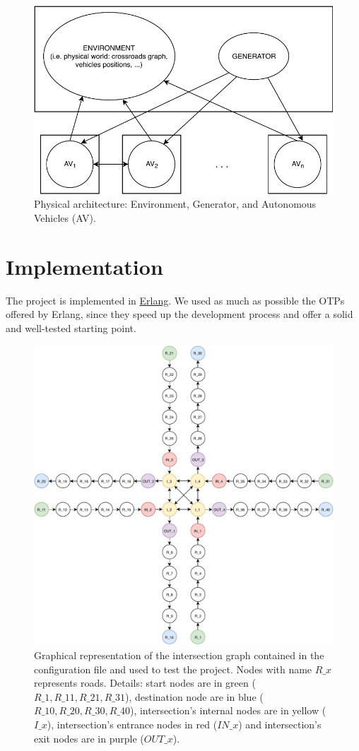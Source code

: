 \documentclass{memoir}
\begin{document}
\begin{figure}
	\centering
	\includegraphics[width=0.8\linewidth]{physical_architecture.pdf}
	\caption{Physical architecture: Environment, Generator, and Autonomous Vehicles (AV).}
	\label{fig:physical-architecture}
\end{figure}


\chapter{Implementation}
The project is implemented in \href{https://www.erlang.org/}{Erlang}. We used as much as possible the OTPs offered by Erlang, since they speed up the development process and offer a solid and well-tested starting point.

\begin{figure}
	\centering
	\includegraphics[width=\linewidth]{config_graph.pdf}
	\caption{Graphical representation of the intersection graph contained in the configuration file and used to test the project. Nodes with name $R\_x$ represents roads. Details: start nodes are in green ($R\_1, R\_11, R\_21, R\_31$), destination node are in blue ($R\_10, R\_20, R\_30, R\_40$), intersection's internal nodes are in yellow ($I\_x$), intersection's entrance nodes in red ($IN\_x$) and intersection's exit nodes are in purple ($OUT\_x$). }
	\label{fig:config-graph}
\end{figure}
\end{document}

